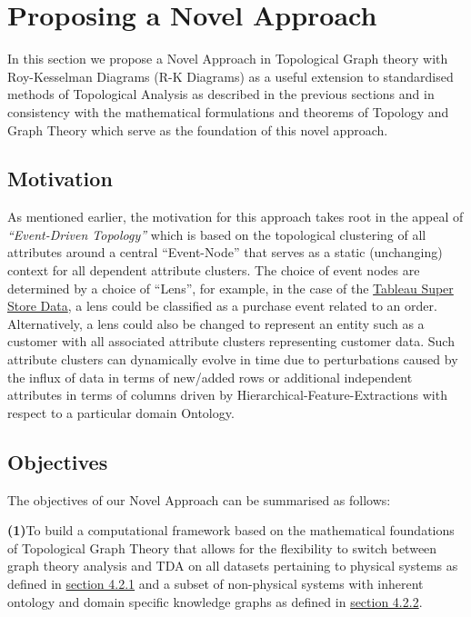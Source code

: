 \section{Proposing a Novel Approach}

In this section we propose a Novel Approach in Topological Graph theory with Roy-Kesselman Diagrams (R-K Diagrams) as a useful extension to standardised methods of Topological Analysis as described in the previous sections and in consistency with the mathematical formulations and theorems of Topology and Graph Theory which serve as the foundation of this novel approach.

\subsection{Motivation}

As mentioned earlier, the motivation for this approach takes root in the appeal of \textit{“Event-Driven Topology”} which is based on the topological clustering of all attributes around a central ``Event-Node'' that serves as a static (unchanging) context for all dependent attribute clusters. The choice of event nodes are determined by a choice of ``Lens'', for example, in the case of the \hyperref[sec:store_sales_section]{Tableau Super Store Data}, a lens could be classified as a purchase event related to an order. Alternatively, a lens could also be changed to represent an entity such as a customer with all associated attribute clusters representing customer data. Such attribute clusters can dynamically evolve in time due to perturbations caused by the influx of data in terms of new/added rows or additional independent attributes in terms of columns driven by Hierarchical-Feature-Extractions with respect to a particular domain Ontology.

\subsection{Objectives}

The objectives of our Novel Approach can be summarised as follows:

  \textbf{(1)}To build a computational framework based on the mathematical foundations of Topological Graph Theory that allows for the flexibility to switch between graph theory analysis and TDA on all datasets pertaining to physical systems as defined in  \hyperref[sec:PhysicalSystems]{section 4.2.1}  and a subset of non-physical systems with inherent ontology and domain specific knowledge graphs as defined in  \hyperref[sec:NonPhysical]{section 4.2.2}.
  
